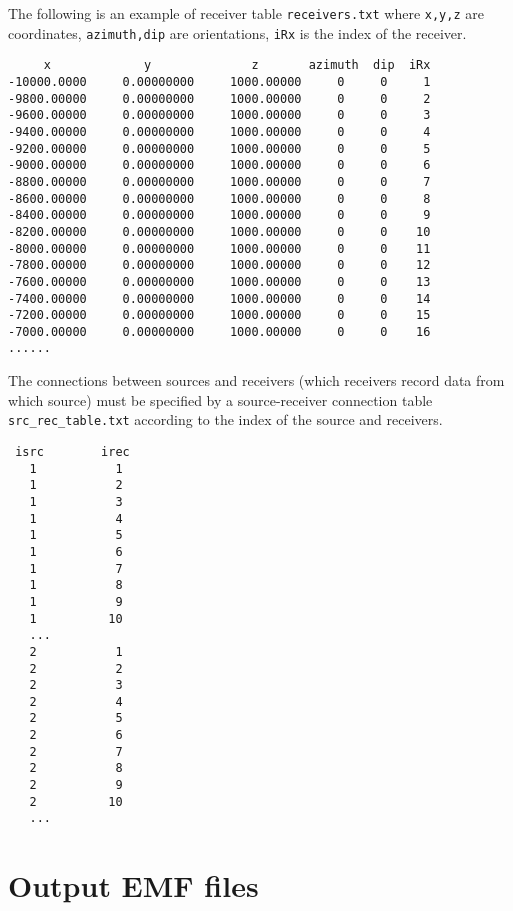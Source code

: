 \documentclass[a4paper,10pt]{article}
\begin{document}
The following is an example of receiver table \texttt{receivers.txt} where \texttt{x,y,z} are coordinates, \texttt{azimuth,dip} are orientations, \texttt{iRx} is the index of the receiver.
\begin{verbatim}
     x             y              z       azimuth  dip  iRx
-10000.0000     0.00000000     1000.00000     0     0     1
-9800.00000     0.00000000     1000.00000     0     0     2
-9600.00000     0.00000000     1000.00000     0     0     3
-9400.00000     0.00000000     1000.00000     0     0     4
-9200.00000     0.00000000     1000.00000     0     0     5
-9000.00000     0.00000000     1000.00000     0     0     6
-8800.00000     0.00000000     1000.00000     0     0     7
-8600.00000     0.00000000     1000.00000     0     0     8
-8400.00000     0.00000000     1000.00000     0     0     9
-8200.00000     0.00000000     1000.00000     0     0    10
-8000.00000     0.00000000     1000.00000     0     0    11
-7800.00000     0.00000000     1000.00000     0     0    12
-7600.00000     0.00000000     1000.00000     0     0    13
-7400.00000     0.00000000     1000.00000     0     0    14
-7200.00000     0.00000000     1000.00000     0     0    15
-7000.00000     0.00000000     1000.00000     0     0    16
......
\end{verbatim}

The connections between sources and receivers (which receivers record data from which source) must be specified by a source-receiver connection table
\verb|src_rec_table.txt| according to the index of the source and receivers.
\begin{verbatim}
 isrc        irec
   1           1
   1           2
   1           3
   1           4
   1           5
   1           6
   1           7
   1           8
   1           9
   1          10
   ...
   2           1
   2           2
   2           3
   2           4
   2           5
   2           6
   2           7
   2           8
   2           9
   2          10
   ...
\end{verbatim}


\section{Output EMF files}
\end{document}
